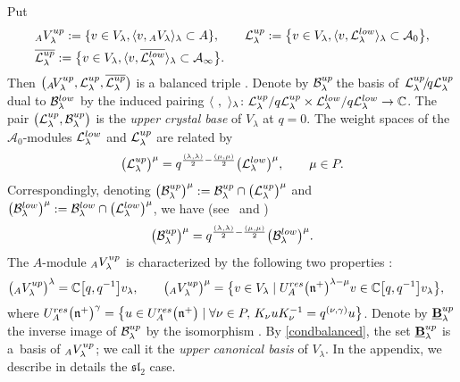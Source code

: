 \documentclass[11pt]{article}
\numberwithin{equation}{section}
\numberwithin{equation}{section}
\theoremstyle{definition}
\newcommand{\mc}{\mathbb{C}}
\newcommand{\Ll}{{\mathcal L}}
\newcommand{\ra}{\rightarrow}
\begin{document}
Put
\begin{align}
& {}_AV_\lambda^{\rm up} := \{v\in V_\lambda, \langle v,{}_AV_\lambda\rangle_\lambda\subset A\},\qquad
\Ll_{\lambda}^{\rm up} := \big\{v\in V_\lambda, \langle v,\Ll_{\lambda}^{\rm low}\rangle_\lambda\subset \mathcal{A}_0\big\},\nonumber\\
&\overline{\Ll_{\lambda}^{\rm up}} := \big\{v\in V_\lambda, \langle v,\overline{\Ll_{\lambda}^{\rm low}}\rangle_\lambda\subset \mathcal{A}_\infty\big\}.\label{upmodule}
\end{align}
Then $\big({}_A\!V_\lambda^{\rm up},\Ll_{\lambda}^{\rm up},\overline{\Ll_{\lambda}^{\rm up}}\big)$ is a balanced triple \cite[Lemma 4.2.1]{Kashiwara2}. Denote by $\mathcal{B}_\lambda^{\rm up}\!$ the basis of~${\Ll_{\lambda}^{\rm up}\!/\!q\Ll_{\lambda}^{\rm up}}$ dual to $\mathcal{B}_\lambda^{\rm low}$ by the induced pairing $\langle\ ,\ \rangle_\lambda\colon \Ll_{\lambda}^{\rm up}/q\Ll_{\lambda}^{\rm up} \times \Ll_{\lambda}^{\rm low}/q\Ll_{\lambda}^{\rm low} \ra \mc$. The pair $\big(\Ll_{\lambda}^{\rm up},\mathcal{B}_\lambda^{\rm up}\big)$ is the {\it upper crystal base} of $V_\lambda$ at $q=0$. The weight spaces of the $\mathcal{A}_0$-modules $\Ll_{\lambda}^{\rm low}$ and $\Ll_{\lambda}^{\rm up}$ are related by
\begin{equation}\label{renormweightA} \big(\Ll_{\lambda}^{\rm up}\big)^\mu = q^{\frac{(\lambda,\lambda)}{2} - \frac{(\mu,\mu)}{2}} \big(\Ll_{\lambda}^{\rm low}\big)^\mu , \qquad \mu\in P. \end{equation}
Correspondingly, denoting $\big(\mathcal{B}_\lambda^{\rm up}\big)^\mu := \mathcal{B}_\lambda^{\rm up} \cap \big(\Ll_\lambda^{\rm up}\big)^\mu$ and $\big(\mathcal{B}_\lambda^{\rm low}\big)^\mu := \mathcal{B}_\lambda^{\rm low} \cap \big(\Ll_\lambda^{\rm low}\big)^\mu$, we have (see~\cite{Kashiwara1} and \cite[equation~(4.2.9)]{Kashiwara2})
\[\big(\mathcal{B}_\lambda^{\rm up}\big)^\mu = q^{\frac{(\lambda,\lambda)}{2} - \frac{(\mu,\mu)}{2}} \big(\mathcal{B}_\lambda^{\rm low}\big)^\mu.\]
The $A$-module ${}_AV_\lambda^{\rm up}$ is characterized by the following two properties \cite[equations~(4.2.10)--(4.2.12)]{Kashiwara2}:
\begin{align*}
\big({}_AV_\lambda^{\rm up}\big)^\lambda & = \mc\big[q,q^{-1}\big]v_\lambda,\qquad
\big({}_AV_\lambda^{\rm up}\big)^\mu = \bigl\{v\in V_\lambda \mid U_A^{\rm res}\big(\mathfrak{n}^+\big)^{\lambda-\mu} v \in \mc\big[q,q^{-1}\big]v_\lambda\bigr\},
\end{align*}
where $U_A^{\rm res}\big(\mathfrak{n}^+\big)^{\gamma} = \big\{u\in U_A^{\rm res}\big(\mathfrak{n}^+\big) \mid \forall \nu\in P, \, K_\nu uK_\nu^{-1} = q^{(\nu,\gamma)}u\big\}$. Denote by $\underline{\mathbf{B}}_\lambda^{\rm up}$ the inverse image of $\mathcal{B}_\lambda^{\rm up}$ by the isomorphism \smash{${}_AV_\lambda^{\rm up}\cap \Ll_{\lambda}^{\rm up}\cap \overline{\Ll_{\lambda}^{\rm up}} \ra \Ll_{\lambda}^{\rm up}/q\Ll_{\lambda}^{\rm up}$}. By \eqref{condbalanced}, the set $\underline{\mathbf{B}}_\lambda^{\rm up}$ is a~basis of ${}_AV_\lambda^{\rm up}$; we call it the {\it upper canonical basis} of $V_\lambda$. In the appendix, we describe in details the ${\mathfrak{sl}_2}$ case.
\end{document}

